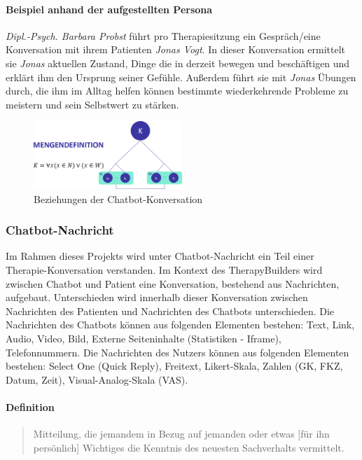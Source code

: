 \paragraph{Beispiel anhand der aufgestellten Persona}
\emph{Dipl.-Psych. Barbara Probst} führt pro Therapiesitzung ein Gespräch/eine Konversation mit ihrem Patienten \emph{Jonas Vogt}. In dieser Konversation ermittelt sie \emph{Jonas} aktuellen Zustand, Dinge die in derzeit bewegen und beschäftigen und erklärt ihm den Ursprung seiner Gefühle. Außerdem führt sie mit \emph{Jonas} Übungen durch, die ihm im Alltag helfen können bestimmte wiederkehrende Probleme zu meistern und sein Selbstwert zu stärken.

\begin{figure}[h]
\centering
\includegraphics[width=0.5\textwidth]{pictures/konvesationdef}
\caption{Beziehungen der Chatbot-Konversation}
\label{therapiedef}
\end{figure}


\subsubsection{Chatbot-Nachricht}
Im Rahmen dieses Projekts wird unter Chatbot-Nachricht ein Teil einer Therapie-Konversation verstanden. Im Kontext des TherapyBuilders wird zwischen Chatbot und Patient eine Konversation, bestehend aus Nachrichten, aufgebaut. Unterschieden wird innerhalb dieser Konversation zwischen Nachrichten des Patienten und Nachrichten des Chatbots unterschieden. Die Nachrichten des Chatbots können aus folgenden Elementen bestehen: Text, Link, Audio, Video, Bild, Externe Seiteninhalte (Statistiken - Iframe), Telefonnummern. Die Nachrichten des Nutzers können aus folgenden Elementen bestehen: Select One (Quick Reply), Freitext, Likert-Skala, Zahlen (GK, FKZ, Datum, Zeit), Visual-Analog-Skala (VAS).

\paragraph{Definition}
\begin{quote}
Mitteilung, die jemandem in Bezug auf jemanden oder etwas [für ihn persönlich] Wichtiges die Kenntnis des neuesten Sachverhalts vermittelt. \cite{DudenNac9:online}
\end{quote}

